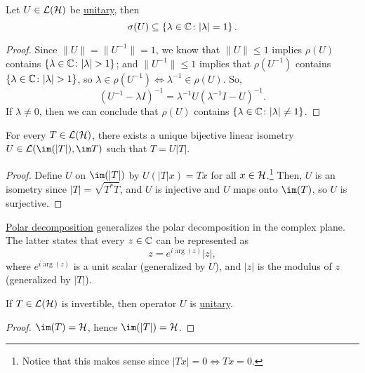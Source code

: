 \begin{proposition}
	Let \(U\in \mathcal{\MakeUppercase{l}} (\mathcal{\MakeUppercase{h}} )\) be \hyperref[def:unitary-op]{unitary}, then
	\[
		\sigma (U) \subseteq \left\{ \lambda \in \mathbb{\MakeUppercase{c}} \colon \vert \lambda  \vert = 1 \right\}.
	\]
\end{proposition}
\begin{proof}
	Since \(\lVert U \rVert = \lVert U^{-1}  \rVert = 1\), we know that \(\lVert U \rVert \leq 1\) implies \(\rho (U)\) contains \(\left\{ \lambda \in \mathbb{\MakeUppercase{c}} \colon \vert \lambda \vert > 1 \right\} \); and \(\lVert U^{-1}  \rVert \leq 1\) implies that \(\rho (U^{-1} )\) contains \(\left\{ \lambda \in \mathbb{\MakeUppercase{c}} \colon \vert \lambda  \vert > 1 \right\} \), so \(\lambda \in \rho (U^{-1} ) \iff \lambda ^{-1} \in \rho (U)\). So,
	\[
		(U ^{-1}  - \lambda I)^{-1} = \lambda ^{-1} U(\lambda ^{-1} I- U)^{-1} .
	\]
	If \(\lambda \neq 0\), then we can conclude that \(\rho (U)\) contains \(\left\{ \lambda \in \mathbb{\MakeUppercase{c}} \colon \vert \lambda  \vert \neq 1 \right\} \).
\end{proof}

\begin{theorem}\label{thm:polar-decomposition}
	For every \(T\in \mathcal{\MakeUppercase{l}} (\mathcal{\MakeUppercase{h}} )\), there exists a unique bijective linear isometry \(U\in \mathcal{\MakeUppercase{l}} (\im (\vert T \vert ), \im T)\) such that \(T = U\vert T \vert \).
\end{theorem}
\begin{proof}
	Define \(U\) on \(\im(\vert T \vert )\) by \(U(\vert T \vert x) = Tx\) for all \(x\in \mathcal{\MakeUppercase{h}} \).\footnote{Notice that this makes sense since \(\vert Tx \vert = 0 \iff Tx = 0\).} Then, \(U\) is an isometry since \(\vert T \vert = \sqrt{T ^{\ast} T} \), and \(U\) is injective and \(U\) maps onto \(\im (T)\), so \(U\) is surjective.
\end{proof}

\hyperref[thm:polar-decomposition]{Polar decomposition} generalizes the polar decomposition in the complex plane. The latter states that every \(z\in \mathbb{\MakeUppercase{c}} \) can be represented as
\[
	z = e^{i \arg (z)} \vert z \vert,
\]
where \(e^{i \arg(z)}\) is a unit scalar (generalized by \(U\)), and \(\vert z \vert \) is the modulus of \(z\) (generalized by \(\vert T \vert\)).

\begin{theorem}\label{thm:polar-decomposition-for-invertible-op}
	If \(T\in \mathcal{\MakeUppercase{l}} (\mathcal{\MakeUppercase{h}} )\) is invertible, then operator \(U\) is \hyperref[def:unitary-op]{unitary}.
\end{theorem}
\begin{proof}
	\(\im(T) = \mathcal{\MakeUppercase{h}} \), hence \(\im(\vert T \vert ) = \mathcal{\MakeUppercase{h}} \).
\end{proof}

